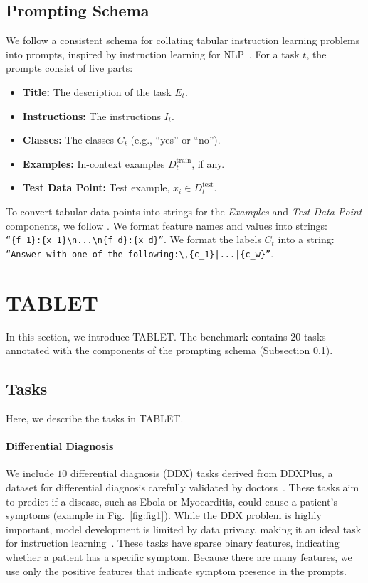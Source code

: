\subsection{Prompting Schema}
\label{subsec:schema}

We follow a consistent schema for collating tabular instruction learning problems into prompts, inspired by instruction learning for NLP~\cite{mishra-etal-2022-cross, supernaturalinstructions}. For a task $t$, the prompts consist of five parts:

\begin{itemize}
    \item \textbf{Title:} The description of the task $E_t$.
    \item \textbf{Instructions:} The instructions $I_t$.
    \item \textbf{Classes:} The classes $C_t$ (e.g., ``yes'' or ``no'').
    \item \textbf{Examples:} In-context examples $D_{t}^{\textrm{train}}$, if any.
    \item \textbf{Test Data Point:} Test example, $x_i \in D_{t}^{\textrm{test}}$.
\end{itemize}

To convert tabular data points into strings for the \textit{Examples} and \textit{Test Data Point} components, we follow \citet{tabllm}.
We format feature names and values into strings: \texttt{``\{f$_1$\}:\{x$_1$\}\textbackslash n...\textbackslash n\{f$_d$\}:\{x$_d$\}''}.
We format the labels $C_t$ into a string: \texttt{``Answer with one of the following:$\,$\{c$_1$\}|...|\{c$_w$\}''}.

\section{TABLET}
\label{sec:tablet}

In this section, we introduce TABLET. The benchmark contains $20$ tasks annotated with the components of the prompting schema (Subsection \ref{subsec:schema}).

\subsection{Tasks}

Here, we describe the tasks in TABLET.

\paragraph{Differential Diagnosis} We include $10$ differential diagnosis (DDX) tasks derived from DDXPlus, a dataset for differential diagnosis carefully validated by doctors~\cite{tchango2022ddxplus}. These tasks aim to predict if a disease, such as Ebola or Myocarditis, could cause a patient's symptoms (example in Fig.~\ref{fig:fig1}).
While the DDX problem is highly important, model development is limited by data privacy, making it an ideal task for instruction learning~\cite{Murdoch2021, NEURIPS2018_b5a1d925}. These tasks have sparse binary features, indicating whether a patient has a specific symptom. Because there are many features, we use only the positive features that indicate symptom presence in the prompts.


